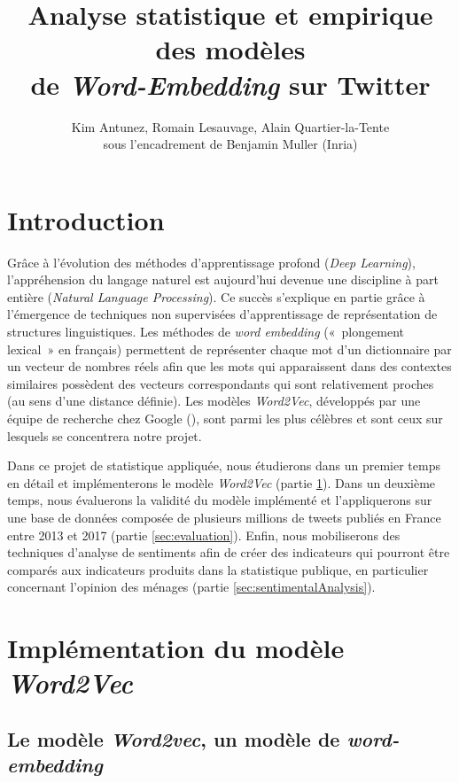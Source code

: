 \documentclass[11pt,french,french]{article}
\title{Analyse statistique et empirique des modèles\\
de \emph{Word-Embedding} sur Twitter}
\author{Kim Antunez, Romain Lesauvage, Alain Quartier-la-Tente\\
sous l'encadrement de Benjamin Muller (Inria)}
\date{}
\begin{document}
\maketitle


{
\hypersetup{linkcolor=black}
\setcounter{tocdepth}{2}
\tableofcontents
}
\newpage 

\section*{Introduction}\label{introduction}

Grâce à l'évolution des méthodes d'apprentissage profond (\emph{Deep
Learning}), l'appréhension du langage naturel est aujourd'hui devenue
une discipline à part entière (\emph{Natural Language Processing}). Ce
succès s'explique en partie grâce à l'émergence de techniques non
supervisées d'apprentissage de représentation de structures
linguistiques. Les méthodes de \emph{word embedding} («~plongement
lexical~» en français) permettent de représenter chaque mot d'un
dictionnaire par un vecteur de nombres réels afin que les mots qui
apparaissent dans des contextes similaires possèdent des vecteurs
correspondants qui sont relativement proches (au sens d'une distance
définie). Les modèles \emph{Word2Vec}, développés par une équipe de
recherche chez Google (\cite{Mikolov}), sont parmi les plus célèbres et
sont ceux sur lesquels se concentrera notre projet.

Dans ce projet de statistique appliquée, nous étudierons dans un premier
temps en détail et implémenterons le modèle \emph{Word2Vec} (partie
\ref{sec:word2vec}). Dans un deuxième temps, nous évaluerons la validité
du modèle implémenté et l'appliquerons sur une base de données composée
de plusieurs millions de tweets publiés en France entre 2013 et 2017
(partie \ref{sec:evaluation}). Enfin, nous mobiliserons des techniques
d'analyse de sentiments afin de créer des indicateurs qui pourront être
comparés aux indicateurs produits dans la statistique publique, en
particulier concernant l'opinion des ménages (partie
\ref{sec:sentimentalAnalysis}).

\section{\texorpdfstring{Implémentation du modèle
\emph{Word2Vec}}{Implémentation du modèle Word2Vec}}\label{sec:word2vec}

\subsection{\texorpdfstring{Le modèle \emph{Word2vec}, un modèle de
\emph{word-embedding}}{Le modèle Word2vec, un modèle de word-embedding}}\label{le-moduxe8le-word2vec-un-moduxe8le-de-word-embedding}
\end{document}
